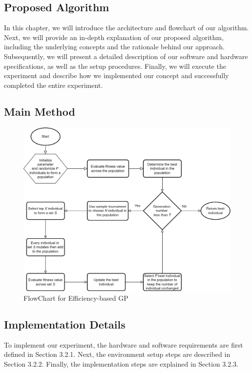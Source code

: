 \begin{ZhChapter}

\chapter{Proposed Algorithm}
In this chapter, we will introduce the architecture and flowchart of our algorithm. Next, we will provide an in-depth explanation of our proposed algorithm, including the underlying concepts and the rationale behind our approach. Subsequently, we will present a detailed description of our software and hardware specifications, as well as the setup procedures. Finally, we will execute the experiment and describe how we implemented our concept and successfully completed the entire experiment.
\section{Main Method} %
\begin{figure}[htbp]
    \centering
    \includegraphics[width = 1\textwidth]{image/FlowChart.png}
    \caption{FlowChart for Efficiency-based GP}
    \label{fig: FlowChart}
\end{figure}

\section{Implementation Details}
To implement our experiment, the hardware and software requirements are first defined in Section 3.2.1. Next, the environment setup steps are described in Section 3.2.2. Finally, the implementation steps are explained in Section 3.2.3.

\end{ZhChapter}
